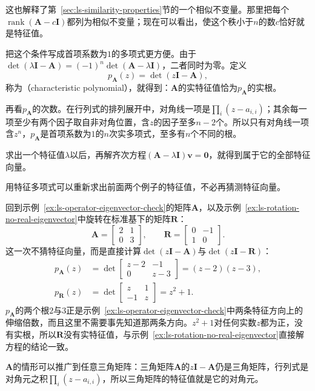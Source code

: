 这也解释了第~\ref{sec:ls-similarity-properties}节的一个相似不变量。那里把每个$\operatorname{rank}(\bm A-c\bm I)$都列为相似不变量；现在可以看出，使这个秩小于$n$的数$c$恰好就是特征值。

把这个条件写成首项系数为$1$的多项式更方便。由于$\det(\lambda\bm I-\bm A)=(-1)^n\det(\bm A-\lambda\bm I)$，二者同时为零。定义
\begin{equation}
 p_{\bm A}(z)=\det(z\bm I-\bm A),
 \label{eq:matrix-analysis-characteristic-polynomial}
\end{equation}
称为（characteristic polynomial），就得到：$\bm A$的实特征值恰为$p_{\bm A}$的实根。

再看$p_{\bm A}$的次数。在行列式的排列展开中，对角线一项是$\prod_i(z-a_{i,i})$；其余每一项至少有两个因子取自非对角位置，含$z$的因子至多$n-2$个。所以只有对角线一项含$z^n$，$p_{\bm A}$是首项系数为$1$的$n$次实多项式，至多有$n$个不同的根。

求出一个特征值$\lambda$以后，再解齐次方程$(\bm A-\lambda\bm I)\bm v=\bm0$，就得到属于它的全部特征向量。

用特征多项式可以重新求出前面两个例子的特征值，不必再猜测特征向量。
\begin{example}[用特征多项式求特征值]
\label{ex:ls-characteristic-polynomial-two-by-two}
回到示例~\ref{ex:ls-operator-eigenvector-check}的矩阵$\bm A$，以及示例~\ref{ex:ls-rotation-no-real-eigenvector}中旋转在标准基下的矩阵$\bm R$：
\[
 \bm A=\begin{bmatrix}2&1\\0&3\end{bmatrix},\qquad
 \bm R=\begin{bmatrix}0&-1\\1&0\end{bmatrix}.
\]
这一次不猜特征向量，而是直接计算$\det(z\bm I-\bm A)$与$\det(z\bm I-\bm R)$：
\[
 \begin{aligned}
 p_{\bm A}(z)&=\det\begin{bmatrix}z-2&-1\\0&z-3\end{bmatrix}=(z-2)(z-3),\\
 p_{\bm R}(z)&=\det\begin{bmatrix}z&1\\-1&z\end{bmatrix}=z^2+1 .
 \end{aligned}
\]
$p_{\bm A}$的两个根$2$与$3$正是示例~\ref{ex:ls-operator-eigenvector-check}中两条特征方向上的伸缩倍数，而且这里不需要事先知道那两条方向。$z^2+1$对任何实数$z$都为正，没有实根，所以$\bm R$没有实特征值，与示例~\ref{ex:ls-rotation-no-real-eigenvector}直接解方程的结论一致。
\end{example}
$\bm A$的情形可以推广到任意三角矩阵：三角矩阵$\bm A$的$z\bm I-\bm A$仍是三角矩阵，行列式是对角元之积$\prod_i(z-a_{i,i})$，所以三角矩阵的特征值就是它的对角元。

